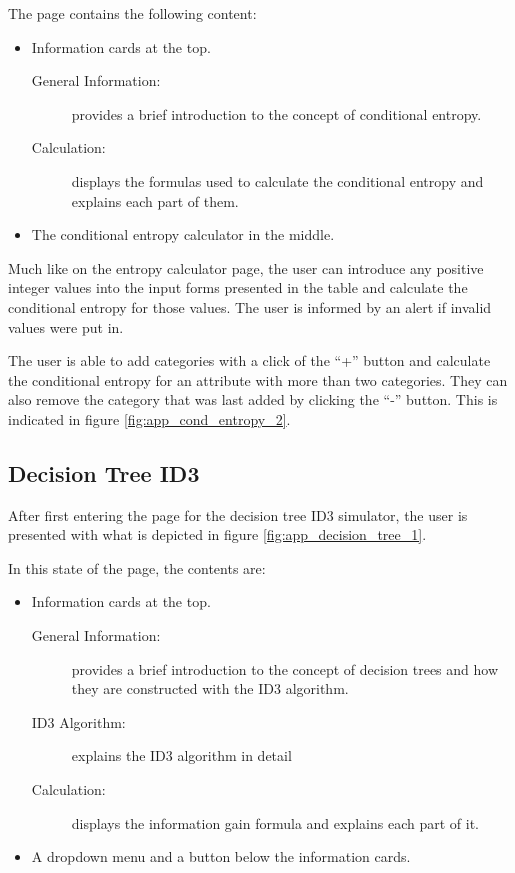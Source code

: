 The page contains the following content:
\begin{itemize}
    \item Information cards at the top.
    \begin{description}
        \item[General Information:] provides a brief introduction to the concept of conditional entropy.
        \item[Calculation:] displays the formulas used to calculate the conditional entropy and explains each part of them.
    \end{description}
    \item The conditional entropy calculator in the middle.
\end{itemize}

Much like on the entropy calculator page, the user can introduce any positive integer values into the input forms presented in the table and calculate the conditional entropy for those values. The user is informed by an alert if invalid values were put in.

The user is able to add categories with a click of the ``+'' button and calculate the conditional entropy for an attribute with more than two categories. They can also remove the category that was last added by clicking the ``-'' button. This is indicated in figure \ref{fig:app_cond_entropy_2}.

\subsection{Decision Tree ID3}
After first entering the page for the decision tree ID3 simulator, the user is presented with what is depicted in figure \ref{fig:app_decision_tree_1}.

In this state of the page, the contents are:
\begin{itemize}
    \item Information cards at the top.
    \begin{description}
        \item[General Information:] provides a brief introduction to the concept of decision trees and how they are constructed with the ID3 algorithm.
        \item[ID3 Algorithm:] explains the ID3 algorithm in detail
        \item[Calculation:] displays the information gain formula and explains each part of it.
    \end{description}
    \item A dropdown menu and a button below the information cards.
\end{itemize}


